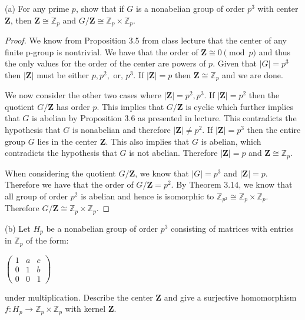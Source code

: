 \documentclass{article}
\theoremstyle{plain} %
\theoremstyle{definition} %
\newcommand{\bZ}{\mathbb{Z}}
\newcommand{\fZ}{\mathbf{Z}}
\begin{document}
\noindent (a) For any prime $p$, show that if $G$ is a nonabelian group of order $p^3$ with center $\mathbf{Z}$, then $\mathbf{Z} \cong
\mathbb{Z}_p$ and $G/\mathbf{Z} \cong \mathbb{Z}_p \times \mathbb{Z}_p$.
\begin{proof}
    We know from Proposition 3.5 from class lecture that the center of any finite p-group is nontrivial. We have that the order of $\mathbf{Z} \cong
    0 \pmod{p}$ and thus the only values for the order of the center are powers of $p$. Given that $|G| = p^3$ then $|\mathbf{Z}|$ must be either
    $p, p^2, \text{ or, }p^3$. If $|\fZ| = p$ then $\mathbf{Z} \cong \mathbb{Z}_p$ and we are done. 
    
    We now consider the other two cases where $|\fZ| = p^2, p^3$. If $|\fZ| = p^2$ then the quotient 
    $G/\fZ$ has order $p$. This implies that $G/\fZ$ is cyclic which further implies that $G$ is abelian by Proposition 3.6 as presented in lecture. This contradicts the hypothesis that 
    $G$ is nonabelian and therefore $|\fZ| \neq p^2$. If $|\fZ| = p^3$ then the entire group $G$ lies in the center $\fZ$.
    This also implies that $G$ is abelian, which contradicts the hypothesis that $G$ is not abelian. Therefore $|\fZ| = p$ and
    $\fZ \cong \bZ_p$.
    
    When considering the quotient $G/\fZ$, we know that $|G| = p^3$ and $|\fZ|= p$. Therefore we have that
    the order of $G/\fZ = p^2$. By Theorem 3.14, we know that all group of order $p^2$ is abelian and hence is isomorphic to
    $\bZ_{p^2} \cong \bZ_p \times \bZ_p$. Therefore $G/\fZ \cong \bZ_p \times \bZ_p$.
\end{proof}

\noindent (b) Let $H_p$ be a nonabelian group of order $p^3$ consisting of matrices with entries in $\mathbb{Z}_p$ of the form:
\begin{center}
    $\begin{pmatrix}
        1 & a & c \\
        0 & 1 & b \\
        0 & 0 & 1
    \end{pmatrix}$
\end{center}
under multiplication.
Describe the center $\mathbf{Z}$ and give a surjective homomorphism $f: H_p \to \mathbb{Z}_p \times \mathbb{Z}_p$ with kernel $\mathbf{Z}$.
\end{document}

